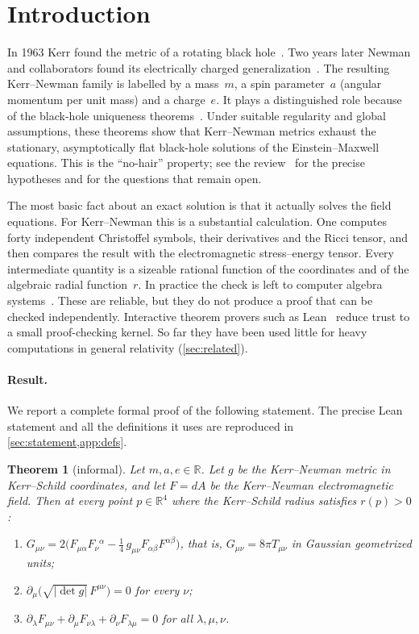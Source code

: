 \documentclass[11pt]{article}
\newtheorem{theorem}{Theorem}[section]
\theoremstyle{definition}
\theoremstyle{remark}
\newcommand{\R}{\mathbb{R}}
\begin{document}
\section{Introduction}\label{sec:intro}

In 1963 Kerr found the metric of a rotating black hole~\cite{kerr1963}.
Two years later Newman and collaborators found its electrically charged generalization~\cite{newman1965}.
The resulting Kerr--Newman family is labelled by a mass~$m$, a spin parameter~$a$ (angular momentum per unit mass) and a charge~$e$.
It plays a distinguished role because of the black-hole uniqueness theorems~\cite{israel1967,israel1968,carter1971,hawking1972,robinson1975,mazur1982,bunting1983}.
Under suitable regularity and global assumptions, these theorems show that Kerr--Newman metrics exhaust the stationary, asymptotically flat black-hole solutions of the Einstein--Maxwell equations.
This is the ``no-hair'' property; see the review~\cite{chrusciel2012} for the precise hypotheses and for the questions that remain open.

The most basic fact about an exact solution is that it actually solves the field equations.
For Kerr--Newman this is a substantial calculation.
One computes forty independent Christoffel symbols, their derivatives and the Ricci tensor, and then compares the result with the electromagnetic stress--energy tensor.
Every intermediate quantity is a sizeable rational function of the coordinates and of the algebraic radial function~$r$.
In practice the check is left to computer algebra systems~\cite{maccallum2018}.
These are reliable, but they do not produce a proof that can be checked independently.
Interactive theorem provers such as Lean~\cite{demoura2021} reduce trust to a small proof-checking kernel.
So far they have been used little for heavy computations in general relativity (\cref{sec:related}).

\paragraph{Result.}
We report a complete formal proof of the following statement.
The precise Lean statement and all the definitions it uses are reproduced in \cref{sec:statement,app:defs}.

\begin{theorem}[informal]\label{thm:main}
Let $m,a,e\in\R$.
Let $g$ be the Kerr--Newman metric in Kerr--Schild coordinates, and let $F=dA$ be the Kerr--Newman electromagnetic field.
Then at every point $p\in\R^4$ where the Kerr--Schild radius satisfies $r(p)>0$:
\begin{enumerate}[label=(\roman*)]
  \item $G_{\mu\nu} = 2\big(F_{\mu\alpha}F_{\nu}{}^{\alpha} - \tfrac14\, g_{\mu\nu}F_{\alpha\beta}F^{\alpha\beta}\big)$, that is, $G_{\mu\nu}=8\pi T_{\mu\nu}$ in Gaussian geometrized units;
  \item $\partial_\mu\big(\sqrt{|\det g|}\,F^{\mu\nu}\big)=0$ for every $\nu$;
  \item $\partial_\lambda F_{\mu\nu}+\partial_\mu F_{\nu\lambda}+\partial_\nu F_{\lambda\mu}=0$ for all $\lambda,\mu,\nu$.
\end{enumerate}
\end{theorem}
\end{document}

